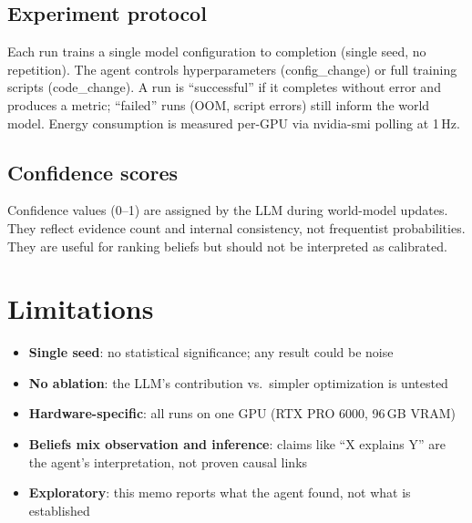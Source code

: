 \documentclass[10pt,a4paper,twocolumn]{article}
\begin{document}
    \subsection*{Experiment protocol}
    Each run trains a single model configuration to completion (single seed, no repetition).
    The agent controls hyperparameters (config\_change) or full training scripts (code\_change).
    A run is ``successful'' if it completes without error and produces a metric;
    ``failed'' runs (OOM, script errors) still inform the world model.
    Energy consumption is measured per-GPU via nvidia-smi polling at 1\,Hz.

    \subsection*{Confidence scores}
    Confidence values (0--1) are assigned by the LLM during world-model updates.
    They reflect evidence count and internal consistency, not frequentist probabilities.
    They are useful for ranking beliefs but should not be interpreted as calibrated.

    \section{Limitations}

    \begin{itemize}
        \item \textbf{Single seed}: no statistical significance; any result could be noise
        \item \textbf{No ablation}: the LLM's contribution vs.\ simpler optimization is untested
        \item \textbf{Hardware-specific}: all runs on one GPU (RTX PRO 6000, 96\,GB VRAM)
        \item \textbf{Beliefs mix observation and inference}: claims like ``X explains Y''
              are the agent's interpretation, not proven causal links
        \item \textbf{Exploratory}: this memo reports what the agent found, not what is established
    \end{itemize}

    
\end{document}

